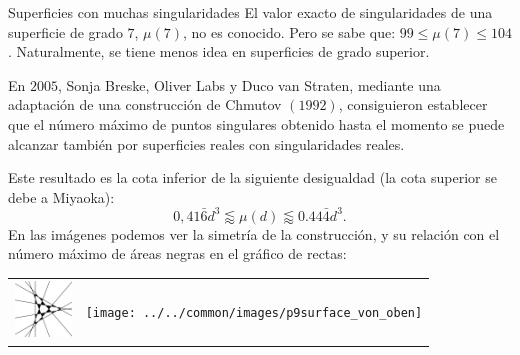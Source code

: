 \begin{surferPage}[216 Singularidades]{Superficies con muchas singularidades}
    El valor exacto de singularidades de una superficie de grado $7$, $\mu(7)$, no es conocido.
    Pero se sabe que: $99\le \mu(7) \le 104$. Naturalmente, se tiene menos idea en superficies de grado superior.
    
    En $2005$, Sonja Breske, Oliver Labs y Duco van Straten, mediante una adaptación de 
    una construcción de Chmutov $(1992)$, consiguieron establecer que el número máximo de puntos singulares
    obtenido hasta el momento se puede alcanzar también por superficies reales con singularidades reales.
    
    Este resultado es la cota inferior de la siguiente desigualdad (la cota superior se debe a Miyaoka):
    \[0,41\bar{6}d^3 \lessapprox \mu(d) \lessapprox 0.44\bar{4} d^3.\]
     En las imágenes podemos ver la simetría de la construcción, y su relación
     con el número máximo de áreas negras en el gráfico de rectas:
    \begin{center}
      \begin{tabular}{c@{\qquad}c}
        \includegraphics[height=1.5cm]{../../common/images/vielesing.pdf}
        &
        \texttt{[image: ../../common/images/p9surface\_von\_oben]}
      \end{tabular}
    \end{center}
\end{surferPage}
